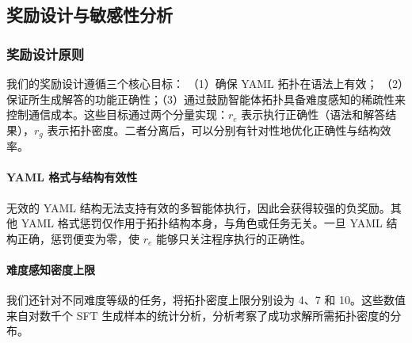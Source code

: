 \documentclass{article}
\theoremstyle{definition}
\begin{document}
\subsection{奖励设计与敏感性分析}

\subsubsection{奖励设计原则}

我们的奖励设计遵循三个核心目标：
（1）确保 YAML 拓扑在语法上有效；
（2）保证所生成解答的功能正确性；（3）通过鼓励智能体拓扑具备难度感知的稀疏性来控制通信成本。这些目标通过两个分量实现：$r_e$ 表示执行正确性（语法和解答结果），$r_g$ 表示拓扑密度。二者分离后，可以分别有针对性地优化正确性与结构效率。

\paragraph{YAML 格式与结构有效性}
无效的 YAML 结构无法支持有效的多智能体执行，因此会获得较强的负奖励。其他 YAML 格式惩罚仅作用于拓扑结构本身，与角色或任务无关。一旦 YAML 结构正确，惩罚便变为零，使 $r_e$ 能够只关注程序执行的正确性。


\paragraph{难度感知密度上限}
我们还针对不同难度等级的任务，将拓扑密度上限分别设为 4、7 和 10。这些数值来自对数千个 SFT 生成样本的统计分析，分析考察了成功求解所需拓扑密度的分布。

\end{document}
